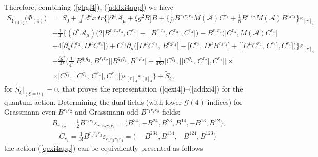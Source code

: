 \documentclass[10pt]{article}
\begin{document}
Therefore, combining (\ref{ghgf4}),  (\ref{addxi4app}) we have
\begin{align}
  S_{Y_{(4)\xi}}\big({\Phi}_{(4)}\big) & = S_0 +  \int d^{d}x\ tr \Bigg\{  \Big[    \partial^{\mu}\mathcal{A}_{\mu
}  + {\xi g^2} B\Big]  B +  \Big\{\frac{1}{3!} B^{r_1r_2r_3}M(\mathcal{A})  C^{r_4} + \frac{1}{8} B^{r_1r_2}M(\mathcal{A})  B^{r_3r_4} \Big\}\varepsilon_{[r]_4} \nonumber \\
 \phantom{S_{Y_{(4)\xi}}\big({\Phi}_{(4)}\big)} & + \frac{1}{4!}\Big\{(\partial^\mu\mathcal{ A}_{\mu })  \Big(2\big[B^{r_1r_2r_3}, C^{r_4}\big]  - \big[\big[B^{r_1r_2}, C^{r_3}\big], C^{r_4}\big]\Big) -  B^{r_1r_2}\Big(\big[ C^{r_3},  M(\mathcal{A})C^{r_4}\big]\nonumber \\
\phantom{S_{Y_{(4)\xi}}}&    +4\big[ \partial_\mu C^{r_3},  D^\mu C^{r_4}\big]\Big)+
 C^{r_1}\partial_\mu \Big( \big[D^\mu C^{r_2},\,    B^{r_3r_4}\big] -\big[C^{r_2},\, D^\mu B^{r_3r_4}   \big] + \big[\big[D^\mu C^{r_2},\, C^{r_3}\big],  C^{r_4}\big]\Big)\Big\}\varepsilon_{[r]_4}\nonumber \\
\phantom{S_{Y_{(4)\xi}}\big({\Phi}_{(4)}\big)} &+ \frac{{\xi g^2}}{4!}\Big(\frac{1}{4^2}\big[B^{q_1q_2}, B^{r_1r_2}\big]
\big[B^{q_3q_4}, B^{r_3r_4}\big]   + \frac{1}{4!3!}\big[C^{q_1},\big[\big[C^{q_2},\,C^{r_2}\big] , C^{r_1}\big]\big]\times \nonumber\\
 \phantom{S_{Y_{(4)\xi}}\big({\Phi}_{(4)}\big)} &    \times \big[C^{q_3},\big[\big[C^{q_4},\,C^{r_4}\big] , C^{r_3}\big]\big]\Big)\varepsilon_{[r]_4}\varepsilon_{[q]_4} \Bigg\}+ \widetilde{S}_\xi,
\label{qexi4app}
\end{align}
for $\widetilde{S}_\xi\big|_{(\xi=0)} =0$, that proves the representation (\ref{qexi4})--(\ref{addxi4}) for the quantum action.
Determining the dual  fields (with lower $\mathcal{G}(4)$-indices) for Grassmann-even  $B^{r_1r_2}$ and Grassmann-odd  $B^{r_1r_2r_3}$ fields:
\begin{eqnarray}\label{dual42}
  && B_{r_1r_2} =  \frac{1}{2}B^{r_3r_4}\varepsilon_{r_1r_2r_3r_4} = \big(B^{34}, -B^{24}, B^{23}, B^{14}, -B^{13}, B^{12}\big) ,\\
   \label{dual43}
  && \quad   C_{r_4}= \frac{1}{3!}B^{r_1r_2r_3}\varepsilon_{r_1r_2r_3r_4} = \big(-B^{234}, B^{134},-B^{124}, B^{123}\big)
\end{eqnarray}
the action (\ref{qexi4app}) can be equivalently presented as follows
\end{document}
